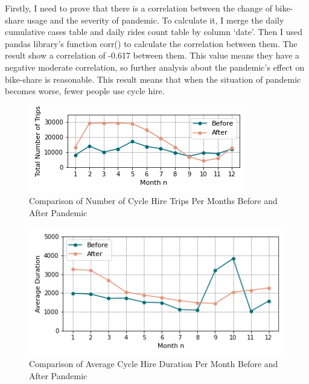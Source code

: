 \documentclass[11pt,a4paper]{article}
\begin{document}
Firstly, I need to prove that there is a correlation between the change of bike-share usage and the severity of pandemic. To calculate it, I merge the daily cumulative cases table and daily rides count table by column ‘date’. Then I used pandas library’s function corr() to calculate the correlation between them. The result show a correlation of -0.617 between them. This value means they have a negative moderate correlation, so further analysis about the pandemic’s effect on bike-share is reasonable. This result means that when the situation of pandemic becomes worse, fewer people use cycle hire.

\begin{figure}[ht!]
  \centering
  \includegraphics{report/ridesFigure.png}
  \caption{Comparison of Number of Cycle Hire Trips Per Months Before and After Pandemic}
  \label{fds-project-template:fig:ridesFigure}
\end{figure}

\begin{figure}[ht!]
  \centering
  \includegraphics{report/durationFigure.png}
  \caption{Comparison of Average Cycle Hire Duration Per Month Before and After Pandemic}
  \label{fds-project-template:fig:durationFigure}
\end{figure}
\end{document}
